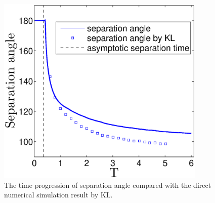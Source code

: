 \begin{figure}
 \begin{center}
 \includegraphics[width=10cm]{./Figures/separation_angle.eps}
 \end{center}
 \caption[Evolution of separation angle]{The time progression of separation angle compared with the direct numerical simulation result by KL.}
 \label{fig:separation_angle}
\end{figure}


